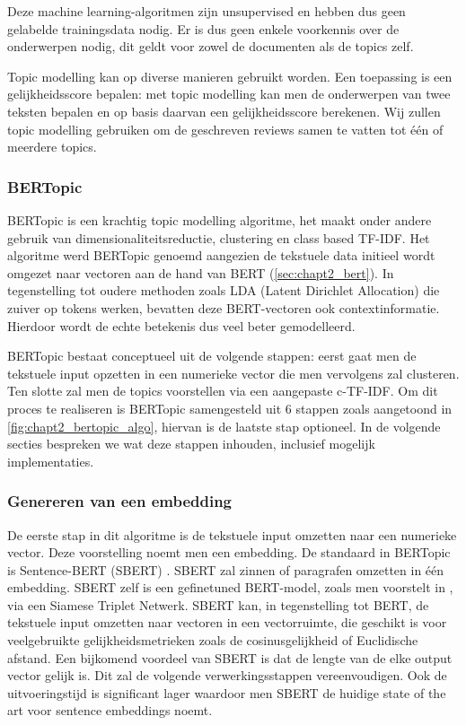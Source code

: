 Deze machine learning-algoritmen zijn unsupervised en hebben dus geen gelabelde trainingsdata nodig. Er is dus geen enkele voorkennis over de onderwerpen nodig, dit geldt voor zowel de documenten als de topics zelf. 

Topic modelling kan op diverse manieren gebruikt worden. Een toepassing is een gelijkheidsscore bepalen: met topic modelling kan men de onderwerpen van twee teksten bepalen en op basis daarvan een gelijkheidsscore berekenen. Wij zullen topic modelling gebruiken om de geschreven reviews samen te vatten tot één of meerdere topics.

\subsubsection{BERTopic}
\label{sub:chapt2_bertopic}

BERTopic \cite{bertopic_paper} is een krachtig topic modelling algoritme, het maakt onder andere gebruik van dimensionaliteitsreductie, clustering en class based TF-IDF. Het algoritme werd BERTopic genoemd aangezien de tekstuele data initieel wordt omgezet naar vectoren aan de hand van BERT (\ref{sec:chapt2_bert}). In tegenstelling tot oudere methoden zoals LDA (Latent Dirichlet Allocation) \cite{lda_paper} die zuiver op tokens werken, bevatten deze BERT-vectoren ook contextinformatie. Hierdoor wordt de echte betekenis dus veel beter gemodelleerd.


BERTopic bestaat conceptueel uit de volgende stappen: eerst gaat men de tekstuele input opzetten in een numerieke vector die men vervolgens zal clusteren. Ten slotte zal men de topics voorstellen via een aangepaste c-TF-IDF. Om dit proces te realiseren is BERTopic samengesteld uit 6 stappen zoals aangetoond in \autoref{fig:chapt2_bertopic_algo}, hiervan is de laatste stap optioneel. In de volgende secties bespreken we wat deze stappen inhouden, inclusief mogelijk implementaties.

\subsubsection{Genereren van een embedding}
\label{sub:chapt2_bertopic_embedding}
De eerste stap in dit algoritme is de tekstuele input omzetten naar een numerieke vector. Deze voorstelling noemt men een embedding. De standaard in BERTopic is Sentence-BERT (SBERT) \cite{sentence_bert}. SBERT zal zinnen of paragrafen omzetten in één embedding. SBERT zelf is een gefinetuned BERT-model, zoals men voorstelt in \cite{BERT_paper}, via een Siamese Triplet Netwerk. SBERT kan, in tegenstelling tot BERT, de tekstuele input omzetten naar vectoren in een vectorruimte, die geschikt is voor veelgebruikte gelijkheidsmetrieken zoals de cosinusgelijkheid of Euclidische afstand. \cite{sentence_bert}
Een bijkomend voordeel van SBERT is dat de lengte van de elke output vector gelijk is. Dit zal de volgende verwerkingsstappen vereenvoudigen. Ook de uitvoeringstijd is significant lager waardoor men SBERT de huidige state of the art voor sentence embeddings noemt.

